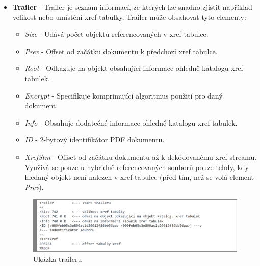 \begin{itemize}
	\item \textbf{Trailer} -  Trailer je seznam informací, ze kterých lze snadno zjistit například velikost nebo umístění xref tabulky. Trailer může obsahovat tyto elementy:
	\begin{itemize}
		\item \textit{Size} - Udává počet objektů referencovaných v xref tabulce. 
		\item \textit{Prev} - Offset od začátku dokumentu k předchozí xref tabulce.
		\item \textit{Root} - Odkazuje na objekt obsahující informace ohledně katalogu xref tabulek.
		\item \textit{Encrypt} - Specifikuje komprimující algoritmus použití pro daný dokument.
		\item \textit{Info} - Obsahuje dodatečné informace ohledně katalogu xref tabulek.
		\item \textit{ID} - 2-bytový identifikátor PDF dokumentu.
		\item \textit{XrefStm} - Offset od začátku dokumentu až k dekódovanému xref streamu. Využívá se pouze u hybridně-referencovaných souborů pouze tehdy, kdy hledaný objekt není nalezen v xref tabulce (před tím, než se volá element \textit{Prev}). 
	\end{itemize}
	\begin{figure}[h!]
	\centering
	\includegraphics[width=15cm]{img/pdf_trailer}
	\caption{Ukázka traileru}
	\label{fig:pdf_trailer}
	\end{figure}
\end{itemize}
